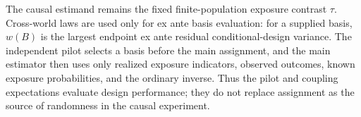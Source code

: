The causal estimand remains the fixed finite-population exposure contrast \(\tau\).  Cross-world laws are used only for ex ante basis evaluation: for a supplied basis, \(w(B)\) is the largest endpoint ex ante residual conditional-design variance.  The independent pilot selects a basis before the main assignment, and the main estimator then uses only realized exposure indicators, observed outcomes, known exposure probabilities, and the ordinary inverse.  Thus the pilot and coupling expectations evaluate design performance; they do not replace assignment as the source of randomness in the causal experiment.